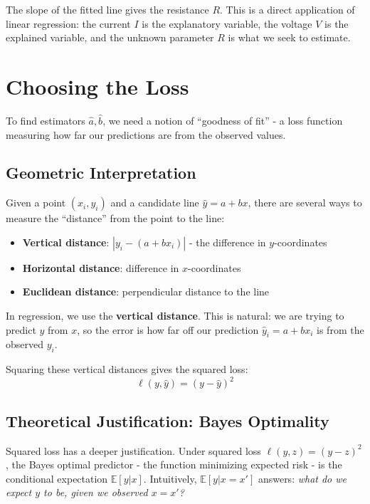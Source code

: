 \documentclass[main.tex]{subfiles}
\begin{document}
The slope of the fitted line gives the resistance $R$. This is a direct application of linear regression: the current $I$ is the explanatory variable, the voltage $V$ is the explained variable, and the unknown parameter $R$ is what we seek to estimate.

\needspace{0.33\textheight}
\section{Choosing the Loss}

To find estimators $\hat{a}, \hat{b}$, we need a notion of ``goodness of fit'' - a loss function measuring how far our predictions are from the observed values.

\subsection{Geometric Interpretation}

Given a point $(x_i, y_i)$ and a candidate line $\hat{y} = a + bx$, there are several ways to measure the ``distance'' from the point to the line:

\begin{itemize}
    \item \textbf{Vertical distance}: $|y_i - (a + bx_i)|$ - the difference in $y$-coordinates
    \item \textbf{Horizontal distance}: difference in $x$-coordinates
    \item \textbf{Euclidean distance}: perpendicular distance to the line
\end{itemize}

In regression, we use the \textbf{vertical distance}. This is natural: we are trying to predict $y$ from $x$, so the error is how far off our prediction $\hat{y}_i = a + bx_i$ is from the observed $y_i$.

Squaring these vertical distances gives the squared loss:
$$\ell(y, \hat{y}) = (y - \hat{y})^2$$

\subsection{Theoretical Justification: Bayes Optimality}

Squared loss has a deeper justification. Under squared loss $\ell(y,z) = (y-z)^2$, the Bayes optimal predictor - the function minimizing expected risk - is the conditional expectation $\mathbb{E}[y|x]$. Intuitively, $\mathbb{E}[y|x=x']$ answers: \textit{what do we expect $y$ to be, given we observed $x = x'$?}
\end{document}
